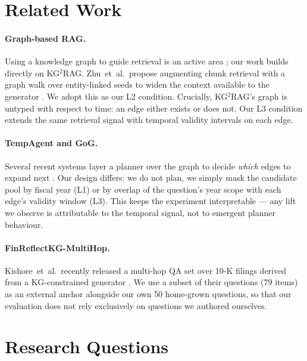 \documentclass[11pt]{article}
\begin{document}
\section{Related Work}
\label{sec:related}

\paragraph{Graph-based RAG.}
Using a knowledge graph to guide retrieval is an active area
\citep{edge2024graphrag}; our work builds directly on KG$^{2}$RAG.
Zhu~et~al.\ propose augmenting chunk retrieval with a graph walk over
entity-linked seeds to widen the context available to the generator
\citep{zhu2025kg2rag}. We adopt this as our L2 condition. Crucially,
KG$^{2}$RAG's graph is untyped with respect to time: an edge either
exists or does not. Our L3 condition extends the same retrieval signal
with temporal validity intervals on each edge.

\paragraph{TempAgent and GoG.}
Several recent systems layer a planner over the graph to decide
\emph{which} edges to expand next \citep{tempagent2025,he2024gog}. Our
design differs: we do not plan, we simply mask the candidate pool by
fiscal year (L1) or by overlap of the question's year scope with each
edge's validity window (L3). This keeps the experiment interpretable ---
any lift we observe is attributable to the temporal signal, not to
emergent planner behaviour.

\paragraph{FinReflectKG-MultiHop.}
Kishore~et~al.\ recently released a multi-hop QA set over 10-K filings
derived from a KG-constrained generator \citep{finreflectkg2025}. We use
a subset of their questions (79 items) as an external anchor alongside
our own 50 home-grown questions, so that our evaluation does not rely
exclusively on questions we authored ourselves.

\section{Research Questions}
\label{sec:rqs}
\end{document}
